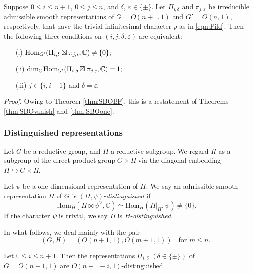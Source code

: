\begin{corollary}
\label{cor:bilin}
Suppose $0 \le i \le n+1$, 
 $0 \le j \le n$, 
 and $\delta$, $\varepsilon \in \{\pm\}$.  
Let $\Pi_{i,\delta}$ and $\pi_{j,\varepsilon}$ be
 irreducible admissible smooth representations of $G=O(n+1,1)$ and $G'=O(n,1)$,  respectively, 
 that have the trivial infinitesimal character $\rho$ as in \eqref{eqn:Pild}. 
Then the following three conditions 
 on $(i,j,\delta,\varepsilon)$ are equivalent:
\begin{enumerate}
\item[{\rm{(i)}}]
${\operatorname{Hom}}_{G'}( \Pi_{i,\delta} \boxtimes \pi_{j,\varepsilon}, {\mathbb C}) \not = \{0\};$
\item[{\rm{(ii)}}]$\dim_{\mathbb{C}}{\operatorname{Hom}}_{G'}(\Pi_{i,\delta} \boxtimes \pi_{j,\varepsilon}, {\mathbb C}) = 1;$
\item[{\rm{(iii)}}]$j \in \{i,i-1 \}$ and $\delta=\varepsilon$.  
\end{enumerate}
\end{corollary}
\begin{proof}
Owing to Theorem \ref{thm:SBOBF}, 
 this is a restatement
 of Theorems \ref{thm:SBOvanish} and \ref{thm:SBOone}.  
\end{proof}
\subsubsection{Distinguished representations}
Let $G$ be a reductive group, 
 and $H$ a reductive subgroup.  
We regard $H$ as a subgroup of the direct product group $G \times H$
 via the diagonal embedding $H \hookrightarrow G \times H$.  

\begin{definition}
Let $\psi$ be a one-dimensional representation of $H$. 
We say an admissible smooth representation  $\Pi$ of $G$ is
$(H,\psi)$-{\it{distinguished}}
 if 
\[ \mbox{Hom}_{H}(\Pi \boxtimes \psi^{\vee}, {\mathbb{C}})
 \simeq \mbox{Hom}_{H}(\Pi|_H, \psi) \not = \{0\}.  
\]
If the character $\psi $ is trivial,
 we say $\Pi$ is 
$H$-{\it{distinguished}}.  
\end{definition}

In what follows, 
 we deal mainly with the pair
\[
   (G,H)=(O(n+1,1), O(m+1,1))
\quad
\text{for  $m \le n$.  }
\]


\begin{theorem}
\label{thm:period1}
Let $0 \le i \le n+1$.  
Then the representations $\Pi_{i,\delta}$ $(\delta \in \{\pm\})$
 of $G=O(n+1,1)$ are  $O(n+1-i,1)$-distinguished. 
\end{theorem}



